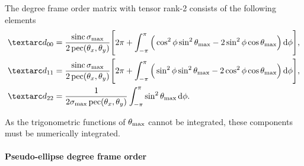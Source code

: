 The  degree frame order matrix with tensor rank-2 consists of the following elements
\begin{subequations} \label{eq: pseudo-ellipse 1st degree frame order matrix}
\begin{align}
    \FO_{00} &= \frac{\sinc\conesmax}{2\pec(\conethetax, \conethetay)} \Bigg[
                    2\pi +
                    \int_{-\pi}^{\pi}
                        \Big( \cos^2\phi \sin^2\conethetamax - 2\sin^2\phi \cos\conethetamax \Big)
                    \diff\phi
                \Bigg] , \\
    \FO_{11} &= \frac{\sinc\conesmax}{2\pec(\conethetax, \conethetay)} \Bigg[
                    2\pi +
                    \int_{-\pi}^{\pi}
                        \Big( \sin^2\phi \sin^2\conethetamax - 2\cos^2\phi \cos\conethetamax \Big)
                    \diff\phi
                \Bigg] , \\
    \FO_{22} &= \frac{1}{2\conesmax\pec(\conethetax, \conethetay)}
                    \int_{-\pi}^{\pi}
                        \sin^2\conethetamax
                    \diff\phi .
\end{align}
\end{subequations}

As the trigonometric functions of $\theta_\textrm{max}$ cannot be integrated, these components must be numerically integrated.


\paragraph{Pseudo-ellipse  degree frame order}

